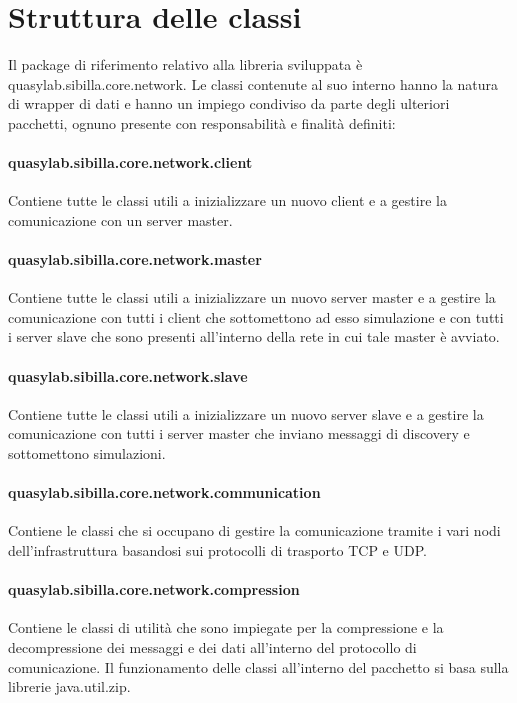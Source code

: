 
\newpage

\section{Struttura delle classi}

Il package di riferimento relativo alla libreria sviluppata è quasylab.sibilla.core.network. Le classi contenute al suo interno hanno la natura di wrapper di dati e hanno un impiego condiviso da parte degli ulteriori pacchetti, ognuno presente con responsabilità e finalità definiti:

\paragraph{quasylab.sibilla.core.network.client} Contiene tutte le classi utili a inizializzare un nuovo client e a gestire la comunicazione con un server master.

\paragraph{quasylab.sibilla.core.network.master} Contiene tutte le classi utili a inizializzare un nuovo server master e a gestire la comunicazione con tutti i client che sottomettono ad esso simulazione e con tutti i server slave che sono presenti all’interno della rete in cui tale master è avviato.

\paragraph{quasylab.sibilla.core.network.slave} Contiene tutte le classi utili a inizializzare un nuovo server slave e a gestire la comunicazione con tutti i server master che inviano messaggi di discovery e sottomettono simulazioni.

\paragraph{quasylab.sibilla.core.network.communication} Contiene le classi che si occupano di gestire la comunicazione tramite i vari nodi dell’infrastruttura basandosi sui protocolli di trasporto TCP e UDP. 

\paragraph{quasylab.sibilla.core.network.compression} Contiene le classi di utilità che sono impiegate per la compressione e la decompressione dei messaggi e dei dati all’interno del protocollo di comunicazione. Il funzionamento delle classi all’interno del pacchetto si basa sulla librerie java.util.zip.

